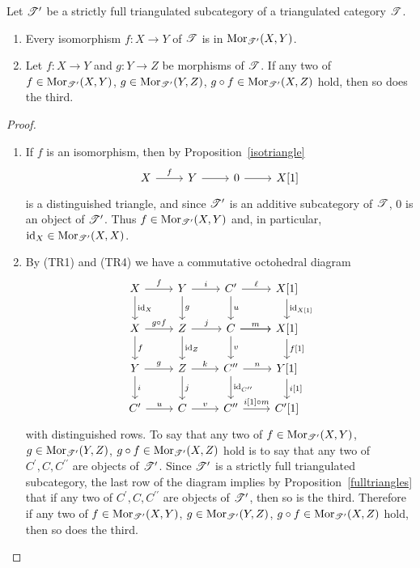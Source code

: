 \documentclass[dissertation.tex]{subfiles}
\begin{document}
\begin{lem}\label{moriscat}
  Let $\mathscr{T}^\prime$ be a strictly full triangulated subcategory of a triangulated category $\mathscr{T}$.
  \begin{enumerate}
    \item
      Every isomorphism $f : X \rightarrow Y$ of $\mathscr{T}$ is in $\operatorname{Mor}_{\mathscr{T}^\prime}(X,Y)$.
    \item
      Let $f : X \rightarrow Y$ and $g : Y \rightarrow Z$ be morphisms of $\mathscr{T}$.
      If any two of 
      $f \in \operatorname{Mor}_{\mathscr{T}^\prime}(X,Y)$,
      $g \in \operatorname{Mor}_{\mathscr{T}^\prime}(Y,Z)$,
      $g \circ f \in \operatorname{Mor}_{\mathscr{T}^\prime}(X,Z)$
      hold, then so does the third. 
  \end{enumerate}
  
  \begin{proof}
    \begin{enumerate}
    \item
      If $f$ is an isomorphism, then by Proposition~\ref{isotriangle}
      $$\begin{tikzcd}
        X \arrow{r}{f} & Y \arrow{r} & 0 \arrow{r} & X[1]
      \end{tikzcd}$$
      is a distinguished triangle, and since $\mathscr{T}^\prime$ is an additive subcategory of $\mathscr{T}$, $0$ is an object of $\mathscr{T}^\prime$.
      Thus $f \in \operatorname{Mor}_{\mathscr{T}^\prime}(X,Y)$ and, in particular, $\operatorname{id}_X \in \operatorname{Mor}_{\mathscr{T}^\prime}(X,X)$.
    \item
      By (TR1) and (TR4) we have a commutative octohedral diagram
      $$\begin{tikzcd}
        X \arrow{r}{f}\arrow{d}{\id_X} & Y \arrow{r}{i}\arrow{d}{g} & C^\prime \arrow{r}{\ell}\arrow{d}{u} & X[1] \arrow{d}{\id_{X[1]}}\\
        X \arrow{r}{g \circ f}\arrow{d}{f} & Z\arrow{r}{j}\arrow{d}{\id_{Z}} & \arrow{r} C \arrow{r}{m}\arrow{d}{v} & X[1]\arrow{d}{f[1]}\\
        Y \arrow{r}{g}\arrow{d}{i} & Z \arrow{r}{k}\arrow{d}{j} & C^{\prime\prime}\arrow{d}{\id_{C^{\prime\prime}}} \arrow{r}{n} & Y[1]\arrow{d}{i[1]}\\
        C^\prime \arrow{r}{u} & C \arrow{r}{v} & C^{\prime\prime}\arrow{r}{i[1] \circ m} & C^\prime[1]
      \end{tikzcd}$$
      with distinguished rows.
      To say that any two of 
      $f \in \operatorname{Mor}_{\mathscr{T}^\prime}(X,Y)$,
      $g \in \operatorname{Mor}_{\mathscr{T}^\prime}(Y,Z)$,
      $g \circ f \in \operatorname{Mor}_{\mathscr{T}^\prime}(X,Z)$
      hold is to say that any two of $C^\prime, C, C^{\prime\prime}$ are objects of $\mathscr{T}^\prime$.
      Since $\mathscr{T}^\prime$ is a strictly full triangulated subcategory, the last row of the diagram implies by Proposition~\ref{fulltriangles} that if any two of $C^\prime, C, C^{\prime\prime}$ are objects of $\mathscr{T}^\prime$, then so is the third.
      Therefore if any two of 
      $f \in \operatorname{Mor}_{\mathscr{T}^\prime}(X,Y)$,
      $g \in \operatorname{Mor}_{\mathscr{T}^\prime}(Y,Z)$,
      $g \circ f \in \operatorname{Mor}_{\mathscr{T}^\prime}(X,Z)$
      hold, then so does the third.
    \end{enumerate}
  \end{proof}
\end{lem}
\end{document}
